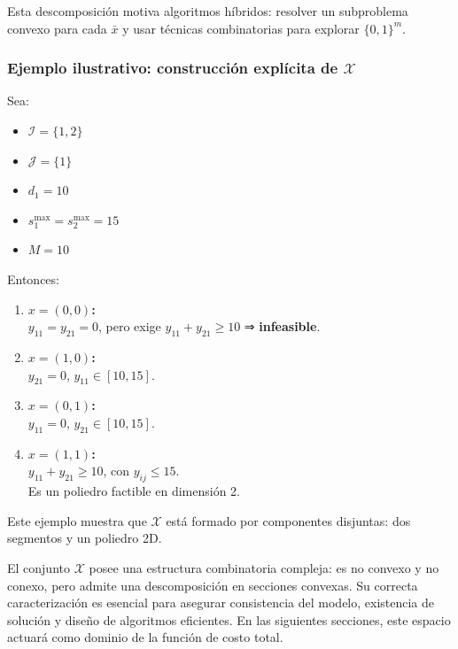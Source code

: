 \documentclass[
  spanish,
  us-letterpaper,
  DIV=11,
  numbers=noendperiod]{scrreprt}
\providecommand{\tightlist}{%
  \setlength{\itemsep}{0pt}\setlength{\parskip}{0pt}}
\numberwithin{equation}{section}
\begin{document}
Esta descomposición motiva algoritmos híbridos: resolver un subproblema
convexo para cada \(\bar{x}\) y usar técnicas combinatorias para
explorar \(\{0,1\}^m\).

\subsubsection{\texorpdfstring{\textbf{Ejemplo ilustrativo: construcción
explícita de
\(\mathcal{X}\)}}{Ejemplo ilustrativo: construcción explícita de \textbackslash mathcal\{X\}}}\label{ejemplo-ilustrativo-construcciuxf3n-expluxedcita-de-mathcalx}

Sea:

\begin{itemize}
\tightlist
\item
  \(\mathcal{I} = \{1,2\}\)
\item
  \(\mathcal{J} = \{1\}\)\\
\item
  \(d_1 = 10\)\\
\item
  \(s_1^{\max} = s_2^{\max} = 15\)\\
\item
  \(M = 10\)
\end{itemize}

Entonces:

\begin{enumerate}
\def\labelenumi{\arabic{enumi}.}
\item
  \textbf{\(x=(0,0)\):}\\
  \(y_{11}=y_{21}=0\), pero exige \(y_{11}+y_{21} \ge 10\) ⇒
  \textbf{infeasible}.
\item
  \textbf{\(x=(1,0)\):}\\
  \(y_{21}=0\), \(y_{11}\in[10,15]\).
\item
  \textbf{\(x=(0,1)\):}\\
  \(y_{11}=0\), \(y_{21}\in[10,15]\).
\item
  \textbf{\(x=(1,1)\):}\\
  \(y_{11}+y_{21}\ge 10\), con \(y_{ij}\le 15\).\\
  Es un poliedro factible en dimensión 2.
\end{enumerate}

Este ejemplo muestra que \(\mathcal{X}\) está formado por componentes
disjuntas: dos segmentos y un poliedro 2D.

El conjunto \(\mathcal{X}\) posee una estructura combinatoria compleja:
es no convexo y no conexo, pero admite una descomposición en secciones
convexas. Su correcta caracterización es esencial para asegurar
consistencia del modelo, existencia de solución y diseño de algoritmos
eficientes. En las siguientes secciones, este espacio actuará como
dominio de la función de costo total.
\end{document}
